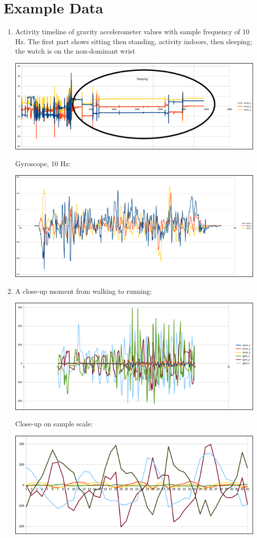 \documentclass[12pt, a4paper]{article}
\begin{document}
\cleardoublepage
\section{Example Data}
\begin{enumerate}
    \item Activity timeline of gravity accelerometer values with sample frequency of 10 Hz. The first part shows sitting then standing, activity indoors, then sleeping; the watch is on the non-dominant wrist
        \begin{center}
    \includegraphics[width=.7\textwidth]{Pic 28.png}
\end{center}
Gyroscope, 10 Hz:
    \begin{center}
    \includegraphics[width=.7\textwidth]{Pic 29.png}
\end{center}
    \item A close-up moment from walking to running:
        \begin{center}
    \includegraphics[width=.7\textwidth]{Pic 30.png}
\end{center}
\cleardoublepage
Close-up on sample scale:
    \begin{center}
    \includegraphics[width=.7\textwidth]{Pic 31.png}

\end{center}
\end{enumerate}
\end{document}
